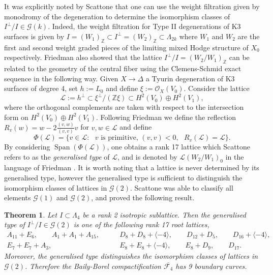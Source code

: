 \documentclass[a4paper]{amsart}
\theoremstyle{definition}
\theoremstyle{plain}
\newtheorem{theorem}[defn]{Theorem}
\theoremstyle{remark}
\newcommand{\Z}{\mathbb{Z}}
\begin{document}
It was explicitly noted by Scattone \cite[Section 6.2]{Sca87} that one can use the weight filtration given by monodromy of the degeneration to determine the isomorphism classes of $I^\perp/I\in \mathscr{G}(k)$. Indeed, the weight filtration for Type II degenerations of K3 surfaces is given by $I=(W_1)_\Z \subset I^\perp =(W_2)_\Z \subset \Lambda_{2k}$ where $W_1$ and $W_2$ are the first and second weight graded pieces of the limiting mixed Hodge structure of $X_0$ respectively. Friedman \cite[Lemma 4]{Fried84} also showed that the lattice $I^\perp/I = (W_2/W_1)_\Z$ can be related to the geometry of the central fiber using the Clemens-Schmid exact sequence in the following way. Given $X \rightarrow \Delta$ a Tyurin degeneration of K3 surfaces of degree 4, set $h:=L_0$ and define $\xi:=\mathcal{O}_X(V_0)$. Consider the lattice 
$$\mathscr{L}:= h ^\perp \subset \xi^\perp/(\Z\xi) \subset  H^2(V_0)\oplus H^2(V_1),$$
where the orthogonal complements are taken with respect to the intersection form on $H^2(V_0)\oplus H^2(V_1)$. Following Friedman \cite[5.1]{Fried84} we define the reflection $R_v(w)=w-2\frac{(v,w)}{(v,v)}v$ for $v,w\in\mathscr{L}$ and define
$$\Phi(\mathscr{L}) = \{v \in \mathscr{L} : \text{ } v \text{ is primitive, } (v,v) < 0, \text{ 
}R_v(\mathscr{L})=  \mathscr{L}\}.$$
By considering $\operatorname{Span}(\Phi(\mathscr{L}))$, one obtains a rank 17 lattice which Scattone refers to as the \textit{generalised type} of $\mathscr{L}$, and is denoted by $\mathscr{L}(W_2/W_1)_0$ in the language of Friedman \cite{Fried84}. It is worth noting that a lattice is never determined by its generalised type, however the generalised type is sufficient to distinguish the isomorphism classes of lattices in $\mathscr{G}(2)$. Scattone was able to classify all elements $\mathscr{G}(1)$ and $\mathscr{G}(2)$, and proved the following result.

\begin{theorem}\cite[Section 6.3]{Sca87}\label{thm:scattone lattices}
Let $I \subset \Lambda_{4}$ be a rank 2 isotropic sublattice. Then the generalised type of $I^\perp/I\in\mathscr{G}(2)$ is one of the following rank 17 root lattices,
\begin{align*}
    A_{11}+E_6,\qquad A_1+A_1+A_{15}, &\qquad D_8+D_8+\langle -4 \rangle, \qquad D_{12}+D_5,\qquad D_{16}+\langle -4 \rangle,\\ E_7+E_7+A_3, &\qquad E_8+E_8+\langle -4 \rangle, \qquad E_8+D_9, \qquad D_{17}.
\end{align*}
Moreover, the generalised type distinguishes the isomorphism classes of lattices in $\mathscr{G}(2)$. Therefore the Baily-Borel compactification $\overline{\mathcal{F}_4}$ has 9 boundary curves.
\end{theorem}
\end{document}
